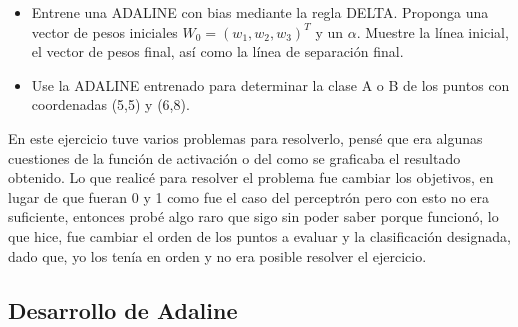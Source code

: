 \begin{itemize}
    \item Entrene una ADALINE con bias mediante la regla DELTA.  Proponga una vector de pesos iniciales $W_0=(w_1,w_2,w_3 )^T$ y un $\alpha$. Muestre la línea inicial, el vector de pesos final, así como la línea de separación final.
	\item Use la ADALINE  entrenado para determinar la clase A o B de los puntos con coordenadas (5,5) y (6,8).
\end{itemize}

En este ejercicio tuve varios problemas para resolverlo, pensé que era algunas cuestiones de la función de activación o del como se graficaba el resultado obtenido. Lo que realicé para resolver el problema fue cambiar los objetivos, en lugar de que fueran 0 y 1 como fue el caso del perceptrón pero con esto no era suficiente, entonces probé algo raro que sigo sin poder saber porque funcionó, lo que hice, fue cambiar el orden de los puntos a evaluar y la clasificación designada, dado que, yo los tenía en orden y no era posible resolver el ejercicio.


\newpage
\subsection{Desarrollo de Adaline}

\clearpage